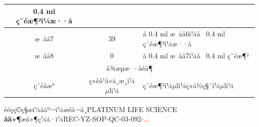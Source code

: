 \documentclass[UTF8,10pt,a4paper,fontset=fandol]{ctexart}
\newcommand{\fieldvalue}[1]{#1}
\newcommand{\handwritten}[1]{#1}
\begin{document}
\begin{tabularx}{\textwidth}{|c|c|X|}
\fieldvalue{\handwritten{0.4}}
ml ç¨éæ¶²ï¼æ··å
\\ \hline
æ åå7 & 39 &
å
\fieldvalue{\handwritten{0.4}}
ml æ åå6ï¼å 
\fieldvalue{\handwritten{0.4}}
ml ç¨éæ¶²ï¼æ··å
\\ \hline
æ åå8 & 0 &
å
\fieldvalue{\handwritten{0.4}}
ml æ åå7ï¼å 
\fieldvalue{\handwritten{0.4}}
ml ç¨éæ¶²
\\ \hline
\multicolumn{3}{|c|}{å¾æµæ ·åéå¶}\\ \hline
ç¨éåæ° & ç»èå¹å»ä¸æ¸ï¼$\mu$lï¼ & ç¨éæ¶²ï¼$\mu$lï¼\quad ç»ä½ç§¯ï¼$\mu$lï¼ \\ \hline
\end{tabularx}


\newpage

\begin{center}
\small
ééçç©ç§æï¼åäº¬ï¼æéå¬å¸\qquad PLATINUM LIFE SCIENCE\\
\textbf{åä»¶}\qquad æä»¶ç¼å·ï¼REC-YZ-SOP-QC-03-092-\textcolor{red}{...}\\[2pt]
\end{center}
\end{document}
